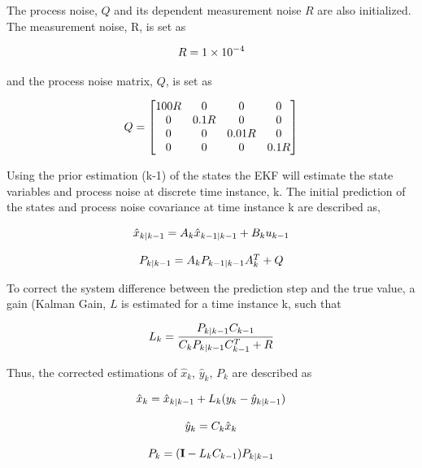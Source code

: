 \documentclass[12pt]{article}
\begin{document}
The process noise, $Q$ and its dependent measurement noise $R$ are also initialized. The measurement noise, R, is set as 

\begin{equation}
\centering
R = 1 \times 10^{-4}
\end{equation}

and the process noise matrix, $Q$, is set as 

\begin{equation}
\centering
Q = 
	\begin{bmatrix}
	100R & 0 & 0 & 0 \\
	0 & 0.1R & 0 & 0 \\
	0 & 0 & 0.01R & 0 \\
	0 & 0 & 0 & 0.1R \\
	\end{bmatrix}
\end{equation}

Using the prior estimation (k-1) of the states the EKF will estimate the state variables and process noise at discrete time instance, k. The initial prediction of the states and process noise covariance at time instance k are described as,

\begin{equation}
\centering
\begin{matrix}

\hat{x}_{k|k-1} = A_k \hat{x}_{k-1|k-1} + B_k u_{k-1} \\ \\

P_{k|k-1} = A_k P_{k-1|k-1} A_k^T + Q

\end{matrix}
\end{equation}

To correct the system difference between the prediction step and the true value, a gain (Kalman Gain, $L$ is estimated for a time instance k, such that 

\begin{equation}
\centering
L_{k} = \frac{P_{k|k-1} C_{k-1}}{C_k P_{k|k-1} C_{k-1}^T + R}
\end{equation}

Thus, the corrected estimations of $\hat{x}_k$, $\hat{y}_k$, $P_{k}$ are described as 

\begin{equation}
\centering
\begin{matrix}
	\hat{x}_k = \hat{x}_{k|k-1} + L_{k}(y_{k} - \hat{y}_{k|k-1}) \\ \\
	\hat{y}_k = C_k\hat{x}_k \\ \\
	P_{k} = (\bold{I} - L_k C_{k-1})P_{k|k-1}
\end{matrix}
\end{equation}
\end{document}
